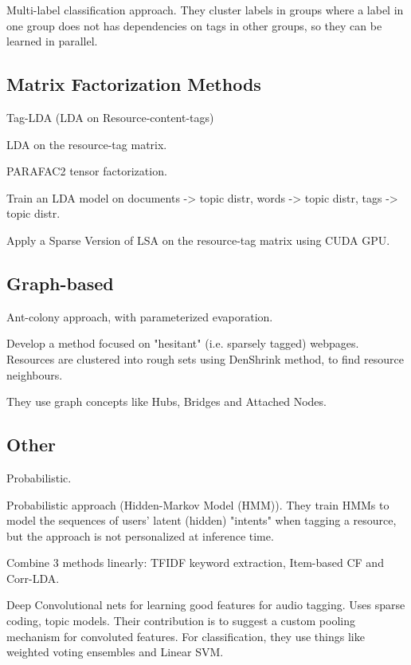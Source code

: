 \cite{barezi_etal_2017}
Multi-label classification approach. They cluster labels in groups where a label in one group does not has dependencies on tags in other groups, so they can be learned in parallel.

\subsection{Matrix Factorization Methods}

\cite{si_sun_2008} Tag-LDA (LDA on Resource-content-tags)

\cite{bundschus_etal_2009} LDA on the resource-tag matrix.

\cite{panagakis_kotropoulos_2011} PARAFAC2 tensor factorization.

\cite{hu_etal_2012} Train an LDA model on documents -> topic distr, words -> topic distr, tags -> topic distr.

\cite{zhang_etal_2014} Apply a Sparse Version of LSA on the resource-tag matrix using CUDA GPU.


\subsection{Graph-based}

\cite{sharma_bedi_2009} Ant-colony approach, with parameterized evaporation.

\cite{wang_etal_2015} Develop a method focused on "hesitant" (i.e. sparsely tagged) webpages. Resources are clustered into rough sets using DenShrink method, to find resource neighbours.

They use graph concepts like Hubs, Bridges and Attached Nodes.

\subsection{Other}

\cite{si_sun_2010} Probabilistic.

\cite{trabelsi_etal_2012} Probabilistic approach (Hidden-Markov Model (HMM)). They train HMMs to model the sequences of users' latent (hidden) "intents" when tagging a resource, but the approach is not personalized at inference time.

\cite{liu_etal_2013} Combine 3 methods linearly: TFIDF keyword extraction, Item-based CF and Corr-LDA.



\cite{sattigeri_etal_2014}
Deep Convolutional nets for learning good features for audio tagging. Uses sparse coding, topic models.
Their contribution is to suggest a custom pooling mechanism for convoluted features.
For classification, they use things like weighted voting ensembles and Linear SVM.


